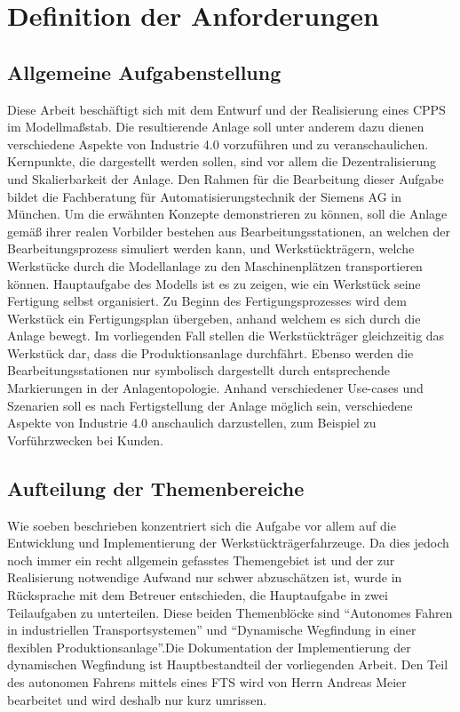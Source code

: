 \chapter{Definition der Anforderungen}

\section{Allgemeine Aufgabenstellung}

	Diese Arbeit beschäftigt sich mit dem Entwurf und der Realisierung eines \ac{CPPS} im Modellmaßstab. Die resultierende Anlage soll unter anderem dazu dienen verschiedene Aspekte von Industrie 4.0 vorzuführen und zu veranschaulichen. Kernpunkte, die dargestellt werden sollen, sind vor allem die Dezentralisierung und Skalierbarkeit der Anlage. Den Rahmen für die Bearbeitung dieser Aufgabe bildet die Fachberatung für Automatisierungstechnik der Siemens AG in München. Um die erwähnten Konzepte demonstrieren zu können, soll die Anlage gemäß ihrer realen Vorbilder bestehen aus Bearbeitungsstationen, an welchen der Bearbeitungsprozess simuliert werden kann, und Werkstückträgern, welche Werkstücke durch die Modellanlage zu den Maschinenplätzen transportieren können. Hauptaufgabe des Modells ist es zu zeigen, wie ein Werkstück seine Fertigung selbst organisiert. Zu Beginn des Fertigungsprozesses wird dem Werkstück ein Fertigungsplan übergeben, anhand welchem es sich durch die Anlage bewegt. Im vorliegenden Fall stellen die Werkstückträger gleichzeitig das Werkstück dar, dass die Produktionsanlage durchfährt. Ebenso werden die Bearbeitungsstationen nur symbolisch dargestellt durch entsprechende Markierungen in der Anlagentopologie. Anhand verschiedener Use-cases und Szenarien soll es nach Fertigstellung der Anlage möglich sein, verschiedene Aspekte von Industrie 4.0 anschaulich darzustellen, zum Beispiel zu Vorführzwecken bei Kunden.

\section{Aufteilung der Themenbereiche}

	Wie soeben beschrieben konzentriert sich die Aufgabe vor allem auf die Entwicklung und Implementierung der Werkstückträgerfahrzeuge. Da dies jedoch noch immer ein recht allgemein gefasstes Themengebiet ist und der zur Realisierung notwendige Aufwand nur schwer abzuschätzen ist, wurde in Rücksprache mit dem Betreuer entschieden, die Hauptaufgabe in zwei Teilaufgaben zu unterteilen. Diese beiden Themenblöcke sind "`Autonomes Fahren in industriellen Transportsystemen"' und "`Dynamische Wegfindung in einer flexiblen Produktionsanlage"'\cite{I40Modell}.Die Dokumentation der Implementierung der dynamischen Wegfindung ist Hauptbestandteil der vorliegenden Arbeit. Den Teil des autonomen Fahrens mittels eines \ac{FTS} wird von Herrn Andreas Meier bearbeitet und wird deshalb nur kurz umrissen.

